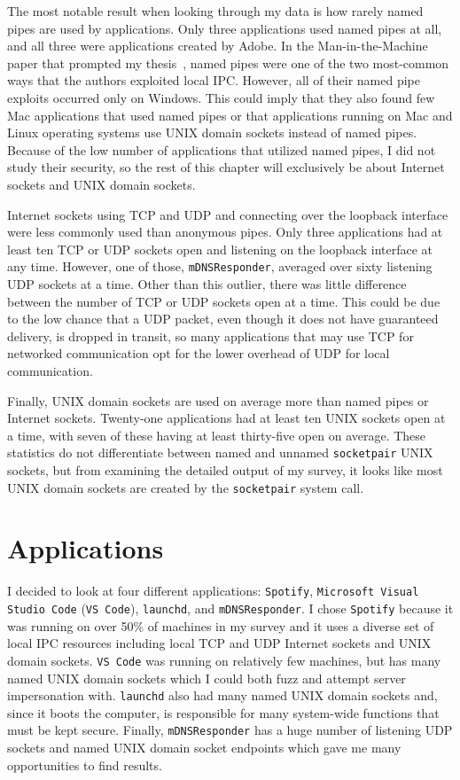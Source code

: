 The most notable result when looking through my data is how rarely named pipes are used by applications.  Only three applications used named pipes at all, and all three were applications created by Adobe.  In the Man-in-the-Machine paper that prompted my thesis~\cite{MitMa}, named pipes were one of the two most-common ways that the authors exploited local IPC.  However, all of their named pipe exploits occurred only on Windows.  This could imply that they also found few Mac applications that used named pipes or that applications running on Mac and Linux operating systems use UNIX domain sockets instead of named pipes.  Because of the low number of applications that utilized named pipes, I did not study their security, so the rest of this chapter will exclusively be about Internet sockets and UNIX domain sockets.

Internet sockets using TCP and UDP and connecting over the loopback interface were less commonly used than anonymous pipes.  Only three applications had at least ten TCP or UDP sockets open and listening on the loopback interface at any time.  However, one of those, \texttt{mDNSResponder}, averaged over sixty listening UDP sockets at a time.  Other than this outlier, there was little difference between the number of TCP or UDP sockets open at a time.  This could be due to the low chance that a UDP packet, even though it does not have guaranteed delivery, is dropped in transit, so many applications that may use TCP for networked communication opt for the lower overhead of UDP for local communication.

Finally, UNIX domain sockets are used on average more than named pipes or Internet sockets.  Twenty-one applications had at least ten UNIX sockets open at a time, with seven of these having at least thirty-five open on average.  These statistics do not differentiate between named and unnamed \texttt{socketpair} UNIX sockets, but from examining the detailed output of my survey, it looks like most UNIX domain sockets are created by the \texttt{socketpair} system call.

\section{Applications}
\label{sec:applications}
I decided to look at four different applications: \texttt{Spotify}, \texttt{Microsoft Visual Studio Code} (\texttt{VS Code}), \texttt{launchd}, and \texttt{mDNSResponder}.  I chose \texttt{Spotify} because it was running on over 50\% of machines in my survey and it uses a diverse set of local IPC resources including local TCP and UDP Internet sockets and UNIX domain sockets.  \texttt{VS Code} was running on relatively few machines, but has many named UNIX domain sockets which I could both fuzz and attempt server impersonation with.  \texttt{launchd} also had many named UNIX domain sockets and, since it boots the computer, is responsible for many system-wide functions that must be kept secure.  Finally, \texttt{mDNSResponder} has a huge number of listening UDP sockets and named UNIX domain socket endpoints which gave me many opportunities to find results.

